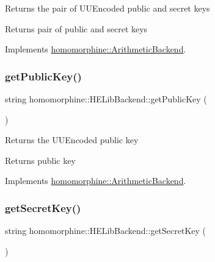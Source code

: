 Returns the pair of U\+U\+Encoded public and secret keys

\begin{DoxyReturn}{Returns}
pair of public and secret keys 
\end{DoxyReturn}


Implements \mbox{\hyperlink{classhomomorphine_1_1_arithmetic_backend_a71bb86054685708001c636e3085d578c}{homomorphine\+::\+Arithmetic\+Backend}}.

\mbox{\label{classhomomorphine_1_1_h_e_lib_backend_a8b096d4780f3b65f0fa0cb3ca6cb9ab8}} 
\subsubsection{\texorpdfstring{getPublicKey()}{getPublicKey()}}
{\footnotesize\ttfamily string homomorphine\+::\+H\+E\+Lib\+Backend\+::get\+Public\+Key (\begin{DoxyParamCaption}{ }\end{DoxyParamCaption})\hspace{0.3cm}{\ttfamily [virtual]}}

Returns the U\+U\+Encoded public key

\begin{DoxyReturn}{Returns}
public key 
\end{DoxyReturn}


Implements \mbox{\hyperlink{classhomomorphine_1_1_arithmetic_backend_a26f31fc0c76cf58636972f68142b9a06}{homomorphine\+::\+Arithmetic\+Backend}}.

\mbox{\label{classhomomorphine_1_1_h_e_lib_backend_a57af39a901a44fef6aad76503739fde4}} 
\subsubsection{\texorpdfstring{getSecretKey()}{getSecretKey()}}
{\footnotesize\ttfamily string homomorphine\+::\+H\+E\+Lib\+Backend\+::get\+Secret\+Key (\begin{DoxyParamCaption}{ }\end{DoxyParamCaption})\hspace{0.3cm}{\ttfamily [virtual]}}


